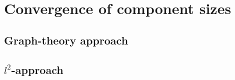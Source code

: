 
\chapter{Convergence of component sizes}

\section{Graph-theory approach}

\section{$l^2$-approach}